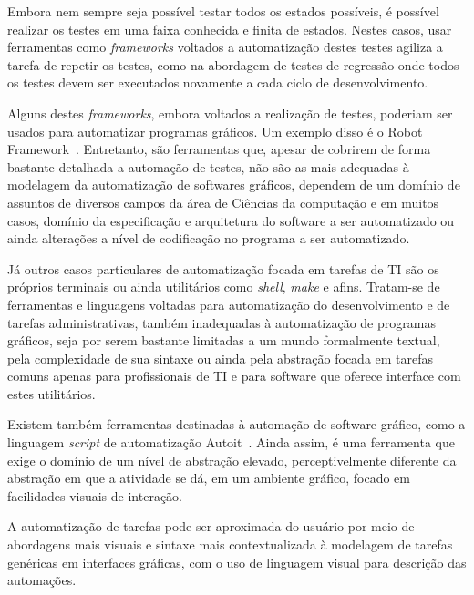 \documentclass[tg]{mdtufsm}
\begin{document}
Embora nem sempre seja possível testar todos os estados possíveis, é possível realizar os testes em uma faixa
conhecida e finita de estados. Nestes casos, usar ferramentas como \emph{frameworks} voltados a automatização destes testes
agiliza a tarefa de repetir os testes, como na abordagem de testes de regressão onde todos os testes devem ser
executados novamente a cada ciclo de desenvolvimento.


Alguns destes \emph{frameworks}, embora voltados a realização de testes, poderiam ser usados para automatizar programas gráficos. Um exemplo disso é o Robot Framework~\cite{robotFW}. Entretanto, são ferramentas que, apesar de cobrirem de forma bastante detalhada a automação de testes, não são as mais adequadas à modelagem da automatização de softwares gráficos, dependem de um domínio de assuntos de diversos campos da área de Ciências da computação e em muitos casos, domínio da especificação e arquitetura do software a ser automatizado ou ainda alterações a nível de codificação no programa a ser automatizado.

Já outros casos particulares de automatização focada em tarefas de TI são os próprios terminais ou ainda utilitários como \emph{shell},  \emph{make} e afins. Tratam-se de ferramentas e linguagens voltadas para automatização do desenvolvimento e de tarefas administrativas, também inadequadas à automatização de programas gráficos, seja por serem bastante limitadas a um mundo formalmente textual, pela complexidade de sua sintaxe ou ainda pela abstração focada em tarefas comuns apenas para profissionais de TI e para software que oferece interface com estes utilitários.

Existem também ferramentas destinadas à automação de software gráfico, como a linguagem \emph{script} de automatização Autoit~\cite{autoit}. Ainda assim, é uma ferramenta que exige o domínio de um nível de abstração elevado, perceptivelmente diferente da abstração em que a atividade se dá, em um ambiente gráfico, focado em facilidades visuais de interação.

A automatização de tarefas pode ser aproximada do usuário por meio de abordagens mais visuais e sintaxe mais contextualizada à modelagem de tarefas genéricas em interfaces gráficas, com o uso de linguagem visual para descrição das automações.
\end{document}
